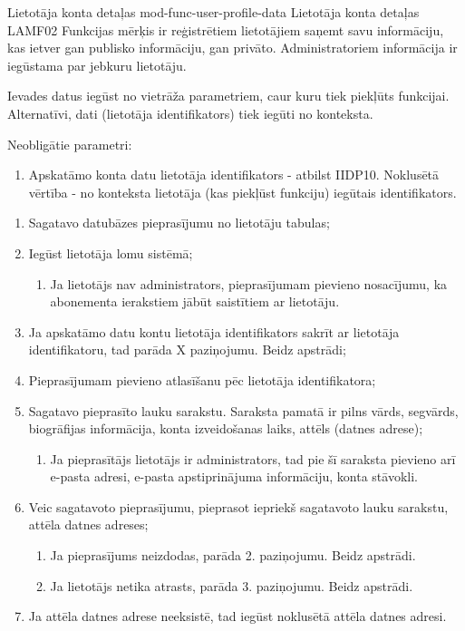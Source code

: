 \moduleFunctionTable
{Lietotāja konta detaļas}
{mod-func-user-profile-data}
{Lietotāja konta detaļas}
{LAMF02}
{
	Funkcijas mērķis ir reģistrētiem lietotājiem saņemt savu informāciju, kas ietver gan publisko informāciju, gan privāto. Administratoriem informācija ir iegūstama par jebkuru lietotāju.
}
{
	Ievades datus iegūst no vietrāža parametriem, caur kuru tiek piekļūts funkcijai. Alternatīvi, dati (lietotāja identifikators) tiek iegūti no konteksta.

	Neobligātie parametri:
	\begin{enumerate}
		\item Apskatāmo konta datu lietotāja identifikators - atbilst IIDP10. Noklusētā vērtība - no konteksta lietotāja (kas piekļūst funkciju) iegūtais identifikators.
	\end{enumerate}
}
{
	\begin{enumerate}
		\item Sagatavo datubāzes pieprasījumu no lietotāju tabulas;
		\item Iegūst lietotāja lomu sistēmā;
		      \begin{enumerate}
			      \item Ja lietotājs nav administrators, pieprasījumam pievieno nosacījumu, ka abonementa ierakstiem jābūt saistītiem ar lietotāju.
		      \end{enumerate}
		\item Ja apskatāmo datu kontu lietotāja identifikators sakrīt ar lietotāja identifikatoru, tad parāda X paziņojumu. Beidz apstrādi;
		\item Pieprasījumam pievieno atlasīšanu pēc lietotāja identifikatora;
		\item Sagatavo pieprasīto lauku sarakstu. Saraksta pamatā ir pilns vārds, segvārds, biogrāfijas informācija, konta izveidošanas laiks, attēls (datnes adrese);
		      \begin{enumerate}
			      \item Ja pieprasītājs lietotājs ir administrators, tad pie šī saraksta pievieno arī e-pasta adresi, e-pasta apstiprinājuma informāciju, konta stāvokli.
		      \end{enumerate}
		\item Veic sagatavoto pieprasījumu, pieprasot iepriekš sagatavoto lauku sarakstu, attēla datnes adreses;
		      \begin{enumerate}
			      \item Ja pieprasījums neizdodas, parāda 2. paziņojumu. Beidz apstrādi.
			      \item Ja lietotājs netika atrasts, parāda 3. paziņojumu. Beidz apstrādi.
		      \end{enumerate}
		\item Ja attēla datnes adrese neeksistē, tad iegūst noklusētā attēla datnes adresi.
	\end{enumerate}
}
